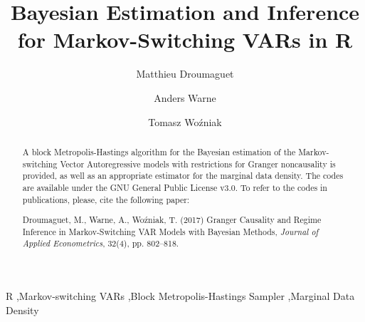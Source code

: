 \documentclass[final,3p,authoryear]{elsarticle}
\begin{document}
\newtheorem{thm}{Theorem}
\newtheorem{cl}{Corollary}
\newtheorem{prop}{Proposition}
\newtheorem{lm}{Lemma}



\begin{frontmatter}

\title{Bayesian Estimation and Inference for  Markov-Switching VARs in R}

\author[eui]{Matthieu Droumaguet}
\author[ecb]{Anders Warne}
\author[um]{Tomasz Wo\'zniak}%

\address[eui]{Department of Economics, European University Institute}
\address[ecb]{Directorate General Research, European Central Bank}
\address[um]{Department of Economics, University of Melbourne\\[2ex]
email: \href{mailto:tomasz.wozniak@unimelb.edu.au}{tomasz.wozniak@unimelb.edu.au}\\[4ex]
\textcopyright{} 2016 Matthieu Droumaguet, Anders Warne, \& Tomasz Wo\'zniak
}



\begin{abstract}
A block Metropolis-Hastings algorithm for the Bayesian estimation of the Markov-switching Vector Autoregressive models with restrictions for Granger noncausality is provided, as well as an appropriate estimator for the marginal data density. The codes are available under the GNU General Public License v3.0. To refer to the codes in publications, please, cite the following paper:

\bigskip\noindent Droumaguet, M., Warne, A., Wo\'zniak, T. (2017) Granger Causality and Regime Inference in Markov-Switching VAR Models with Bayesian Methods, \emph{Journal of Applied Econometrics}, 32(4), pp. 802--818.
\end{abstract}

\begin{keyword}
R \sep Markov-switching VARs \sep Block Metropolis-Hastings Sampler \sep Marginal Data Density
\end{keyword}

\end{frontmatter}
\end{document}
